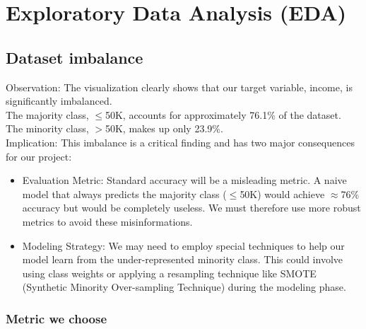\thispagestyle{plain}

\chapter{Exploratory Data Analysis (EDA)}
\label{cp:eda}


\section{Dataset imbalance}

Observation: The visualization clearly shows that our target variable, income, is significantly imbalanced.\\

\noindent The majority class, $\le$50K, accounts for approximately 76.1\% of the dataset.\\
The minority class, $>$50K, makes up only 23.9\%.\\

Implication: This imbalance is a critical finding and has two major consequences for our project:
\begin{itemize}
    \item Evaluation Metric: Standard accuracy will be a misleading metric. A naive model that always predicts the majority class ($\le$50K) would achieve $\approx$76\% accuracy but would be completely useless. We must therefore use more robust metrics to avoid these misinformations.

    \item Modeling Strategy: We may need to employ special techniques to help our model learn from the under-represented minority class. This could involve using class weights or applying a resampling technique like SMOTE (Synthetic Minority Over-sampling Technique) during the modeling phase.
\end{itemize}

\subsection{Metric we choose}

